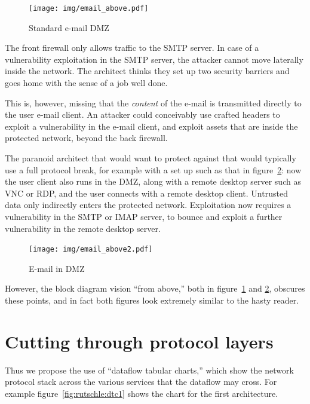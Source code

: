 \documentclass{article}
\begin{document}
\begin{figure}[ht]
	\centering
	\texttt{[image: img/email\_above.pdf]}
	\caption{Standard e-mail DMZ}
	\label{fig:rutschle:email1}
\end{figure}



The front firewall only allows traffic to the SMTP server. In case of a
vulnerability exploitation in the SMTP server, the attacker cannot move
laterally inside the network. The architect thinks they set up two security
barriers and goes home with the sense of a job well done.

This is, however, missing that the \emph{content} of the e-mail is
transmitted directly to the user e-mail client. An attacker could conceivably
use crafted headers to exploit a vulnerability in the e-mail client, and
exploit assets that are inside the protected network, beyond the back firewall.

The paranoid architect that would want to protect against that would typically
use a full protocol break, for example with a set up such as that in
figure~\ref{fig:rutschle:email2}: now the user client also runs in the DMZ,
along with a remote desktop server such as VNC or RDP, and the user connects
with a remote desktop client. Untrusted data only indirectly enters the
protected network.  Exploitation now requires a vulnerability in the SMTP or
IMAP server, to bounce and exploit a further vulnerability in the remote
desktop server.

\begin{figure}[ht]
	\centering
	\texttt{[image: img/email\_above2.pdf]}
	\caption{E-mail in DMZ}
	\label{fig:rutschle:email2}
\end{figure}


However, the block diagram vision ``from above,'' both in
figure~\ref{fig:rutschle:email1} and \ref{fig:rutschle:email2}, obscures these
points, and in fact both figures look extremely similar to the hasty reader.

\section{Cutting through protocol layers}

Thus we propose the use of ``dataflow tabular charts,'' which show the network
protocol stack across the various services that the dataflow may cross. For
example figure~\ref{fig:rutschle:dtc1} shows the chart for the first architecture.
\end{document}
